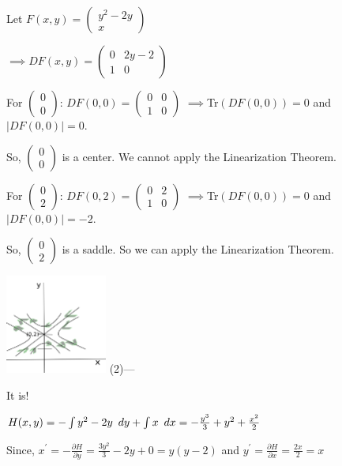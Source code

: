 \documentclass{article}
\begin{document}
Let $F(x, y) = \begin{pmatrix} y^2-2y\\
  x\end{pmatrix}$

$\implies DF(x,y) = \begin{pmatrix} 0 &
  2y -2 \\1 & 0\end{pmatrix}$

For $\begin{pmatrix} 0\\ 0\end{pmatrix}$:
$DF(0,0) = \begin{pmatrix} 0 &
  0 \\1 & 0\end{pmatrix}$ $\implies $Tr$(DF(0,0)) = 0$ and $|DF(0,0)|
= 0$.

So, $\begin{pmatrix} 0\\ 0\end{pmatrix}$ is a center. We cannot apply
the Linearization Theorem.

For $\begin{pmatrix} 0\\ 2\end{pmatrix}$:
$DF(0,2) = \begin{pmatrix} 0 &
  2 \\1 & 0\end{pmatrix}$ $\implies $Tr$(DF(0,0)) = 0$ and $|DF(0,0)|
= -2$.

So, $\begin{pmatrix} 0\\ 2\end{pmatrix}$ is a saddle. So we can apply
the Linearization Theorem.

\includegraphics[width=0.25\textwidth]{saddle}
\newpage
(2)---

It is!

$H(x,y)= -\int y^2-2y\enskip dy +\int x\enskip dx = -\frac{y^3}{3} +y^2
+\frac{x^2}{2}$

Since, $x^\prime = -\frac{\partial H}{\partial y} = \frac{3y^2}{3} -2y
+0 = y(y-2)$ and $y^\prime = \frac{\partial H}{\partial x} = \frac{2x}{2} = x$
\end{document}
